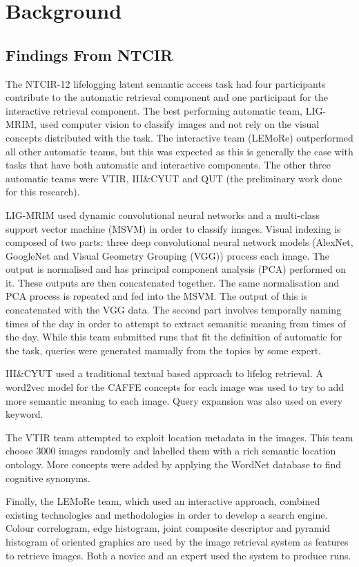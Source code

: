 \chapter{Background}

\section{Findings From NTCIR}
The NTCIR-12 lifelogging latent semantic access task had four participants contribute to the automatic retrieval component and one participant for the interactive retrieval component. The best performing automatic team, LIG-MRIM, used computer vision to classify images and not rely on the visual concepts distributed with the task. The interactive team (LEMoRe) outperformed all other automatic teams, but this was expected as this is generally the case with tasks that have both automatic and interactive components. The other three automatic teams were VTIR, III\&CYUT and QUT (the preliminary work done for this research).

LIG-MRIM used dynamic convolutional neural networks and a multi-class support vector machine (MSVM) in order to classify images. Visual indexing is composed of two parts: three deep convolutional neural network models (AlexNet, GoogleNet and Visual Geometry Grouping (VGG)) process each image. The output is normalised and has principal component analysis (PCA) performed on it. These outputs are then concatenated together. The same normalisation and PCA process is repeated and fed into the MSVM. The output of this is concatenated with the VGG data. The second part involves temporally naming times of the day in order to attempt to extract semanitic meaning from times of the day. While this team submitted runs that fit the definition of automatic for the task, queries were generated manually from the topics by some expert.

III\&CYUT used a traditional textual based approach to lifelog retrieval. A word2vec model for the CAFFE concepts for each image was used to try to add more semantic meaning to each image. Query expansion was also used on every keyword.

The VTIR team attempted to exploit location metadata in the images. This team choose 3000 images randomly and labelled them with a rich semantic location ontology. More concepts were added by applying the WordNet database to find cognitive synonyms.

Finally, the LEMoRe team, which used an interactive approach, combined existing technologies and methodologies in order to develop a search engine. Colour correlogram, edge histogram, joint composite descriptor and pyramid histogram of oriented graphics are used by the image retrieval system as features to retrieve images. Both a novice and an expert used the system to produce runs.